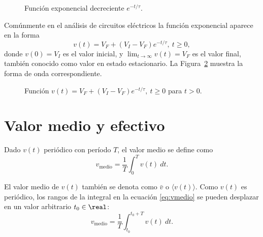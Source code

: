 \documentclass[paper=letter, fontsize=11pt]{scrartcl}
\begin{document}
\begin{figure}[h!]
  \centering
  \caption{Función exponencial decreciente $e^{-t/\tau}$.}
\label{fig:expDec}
\end{figure}

Comúnmente en el análisis de circuitos eléctricos la función exponencial
aparece en la forma
%
\begin{equation}
  v(t) = V_F + (V_I - V_F) e^{-t/\tau}, \ t \ge 0,
\end{equation}
%
donde $v(0)=V_I$ es el valor inicial, y $\lim_{t \to \infty} v(t) = V_F$ es el
valor final, también conocido como valor en estado estacionario. La
Figura~\ref{fig:expGen} muestra la forma de onda correspondiente.

\begin{figure}[h!]
  \centering
  \caption{Función $v(t) = V_F + (V_I - V_F) e^{-t/\tau}, \ t \ge 0$ para $t>0$.}
\label{fig:expGen}
\end{figure}

\section{Valor medio y efectivo}

\begin{defi}
  Dado $v(t)$ periódico con período $T$, el valor medio se define como
  \begin{equation}
    \label{eq:vmedio}
    v_{\text{medio}}  = \frac{1}{T} \int_0^T v(t) \ dt.
  \end{equation}
\end{defi}

El valor medio de $v(t)$ también se denota como $\bar{v}$ o $\langle v(t)
\rangle$. Como $v(t)$ es periódico, los rangos de la integral en la ecuación
\eqref{eq:vmedio} se pueden desplazar en un valor arbitrario $t_0 \in \real$:
%
\begin{equation}
  v_{\text{medio}}  = \frac{1}{T} \int_{t_0}^{t_0+T} v(t) \ dt.
\end{equation}
\end{document}

